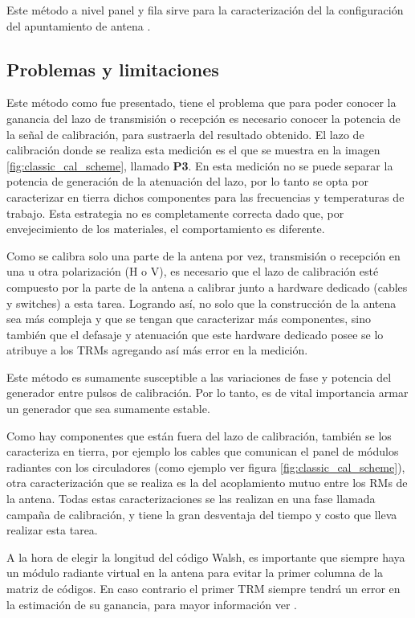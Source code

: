 Este método a nivel panel y fila sirve para la caracterización del la configuración del apuntamiento de antena \cite{Br2007}.

\subsection{Problemas y limitaciones}

Este método como fue presentado, tiene el problema que para poder conocer la ganancia del lazo de transmisión o recepción 
es necesario conocer la potencia de la señal de calibración, para sustraerla del resultado obtenido. El lazo de calibración 
donde se realiza esta medición es el que se muestra en la imagen \ref{fig:classic_cal_scheme}, llamado \textbf{P3}. En esta 
medición no se puede separar la potencia de generación de la atenuación del lazo, por lo tanto se opta por caracterizar en 
tierra dichos componentes para las frecuencias y temperaturas de trabajo. Esta estrategia no es completamente correcta dado
que, por envejecimiento de los materiales, el comportamiento es diferente.

Como se calibra solo una parte de la antena por vez, transmisión o recepción en una u otra polarización (H o V), es necesario que 
el lazo de calibración esté compuesto por la parte de la antena a calibrar junto a hardware dedicado (cables y switches) a esta 
tarea. Logrando así, no solo que la construcción de la antena sea más compleja y que se tengan que caracterizar más componentes, 
sino también que el defasaje y atenuación que este hardware dedicado posee se lo atribuye a los TRMs agregando así más 
error en la medición. 

Este método es sumamente susceptible a las variaciones de fase y potencia del generador entre pulsos de calibración. Por lo 
tanto, es de vital importancia armar un generador que sea sumamente estable.

Como hay componentes que están fuera del lazo de calibración, también se los caracteriza en tierra, por ejemplo los cables 
que comunican el panel de módulos radiantes con los circuladores (como ejemplo ver figura \ref{fig:classic_cal_scheme}), 
otra caracterización que se realiza es la del acoplamiento mutuo entre los RMs de la antena. Todas estas caracterizaciones
se las realizan en una fase llamada campaña de calibración, y tiene la gran desventaja del tiempo y costo que lleva realizar 
esta tarea.

A la hora de elegir la longitud del código Walsh, es importante que siempre haya un módulo radiante virtual en la antena para
evitar la primer columna de la matriz de códigos. En caso contrario el primer TRM siempre tendrá un error en la estimación 
de su ganancia, para mayor información ver \cite{Wang2010}.

